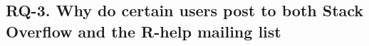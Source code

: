 \documentclass{sig-alternate-05-2015}
\begin{document}






\subsection{RQ-3. Why do certain users post to both Stack Overflow and the R-help mailing list}
\end{document}
